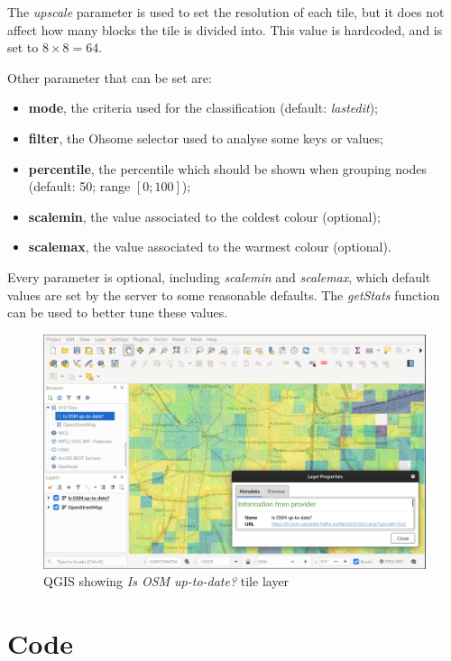 \documentclass{Configuration_Files/PoliMi3i_thesis}
\begin{document}
The \textit{upscale} parameter is used to set the resolution of each tile, but it does not affect how many blocks the tile is divided into. This value is hardcoded, and is set to $ 8 \times 8 = 64 $.

Other parameter that can be set are:
\begin{itemize}
\item \textbf{mode}, the criteria used for the classification (default: \textit{lastedit});
\item \textbf{filter}, the Ohsome selector used to analyse some keys or values;
\item \textbf{percentile}, the percentile which should be shown when grouping nodes (default: 50; range $ [0; 100] $);
\item \textbf{scalemin}, the value associated to the coldest colour (optional);
\item \textbf{scalemax}, the value associated to the warmest colour (optional).
\end{itemize}

Every parameter is optional, including \textit{scalemin} and \textit{scalemax}, which default values are set by the server to some reasonable defaults. The \textit{getStats} function can be used to better tune these values.

\begin{figure}[H]
    \centering
    \includegraphics[width=1\textwidth]{Images/QGIS.png}
    \caption{QGIS showing \textit{Is OSM up-to-date?} tile layer}
    \label{fig:QGIS}
\end{figure}

\section{Code}
\end{document}
